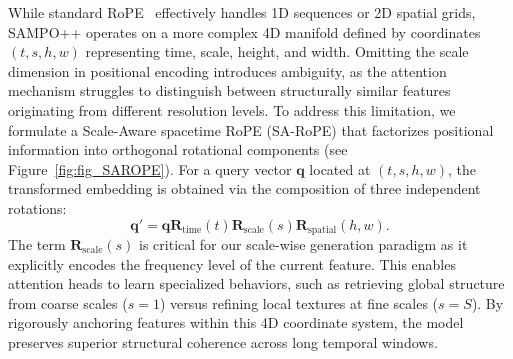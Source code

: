 While standard RoPE~\cite{su2024roformer} effectively handles 1D sequences or 2D spatial grids, SAMPO++ operates on a more complex 4D manifold defined by coordinates $(t, s, h, w)$ representing time, scale, height, and width. Omitting the scale dimension in positional encoding introduces ambiguity, as the attention mechanism struggles to distinguish between structurally similar features originating from different resolution levels. To address this limitation, we formulate a Scale-Aware spacetime RoPE (SA-RoPE) that factorizes positional information into orthogonal rotational components (see Figure~\ref{fig:fig_SAROPE}). For a query vector $\boldsymbol{q}$ located at $(t, s, h, w)$, the transformed embedding is obtained via the composition of three independent rotations:
\begin{equation}
    \boldsymbol{q}' = \boldsymbol{q} \boldsymbol{R}_{\text{time}}(t) \boldsymbol{R}_{\text{scale}}(s) \boldsymbol{R}_{\text{spatial}}(h, w).
\end{equation}
The term $\boldsymbol{R}_{\text{scale}}(s)$ is critical for our scale-wise generation paradigm as it explicitly encodes the frequency level of the current feature. This enables attention heads to learn specialized behaviors, such as retrieving global structure from coarse scales ($s=1$) versus refining local textures at fine scales ($s=S$). By rigorously anchoring features within this 4D coordinate system, the model preserves superior structural coherence across long temporal windows.





